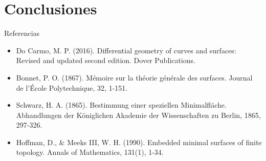 \documentclass[10pt]{beamer}
\begin{document}
\section{Conclusiones }


 \begin{frame}{Referencias}
  \begin{itemize}
    \item Do Carmo, M. P. (2016). Differential geometry of curves and surfaces: Revised and updated second edition. Dover Publications.
    \item Bonnet, P. O. (1867). Mémoire sur la théorie générale des surfaces. Journal de l’École Polytechnique, 32, 1-151.
    \item Schwarz, H. A. (1865). Bestimmung einer speziellen Minimalfläche. Abhandlungen der Königlichen Akademie der Wissenschaften zu Berlin, 1865, 297-326.
    \item Hoffman, D., \& Meeks III, W. H. (1990). Embedded minimal surfaces of finite topology. Annals of Mathematics, 131(1), 1-34.
  \end{itemize}
 \end{frame}
\end{document}
